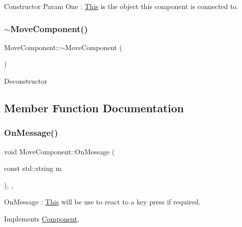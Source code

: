 Constructor Param One \+: \mbox{\hyperlink{class_this}{This}} is the object this component is connected to. \mbox{\label{class_move_component_a5e8430c851f1d83f2b8222c3c4ec097d}} 
\subsubsection{\texorpdfstring{$\sim$\+Move\+Component()}{~MoveComponent()}}
{\footnotesize\ttfamily Move\+Component\+::$\sim$\+Move\+Component (\begin{DoxyParamCaption}{ }\end{DoxyParamCaption})\hspace{0.3cm}{\ttfamily [inline]}}

Deconstructor 

\subsection{Member Function Documentation}
\mbox{\label{class_move_component_a27146b88beda6223ed9f4a82c47a917a}} 
\subsubsection{\texorpdfstring{On\+Message()}{OnMessage()}}
{\footnotesize\ttfamily void Move\+Component\+::\+On\+Message (\begin{DoxyParamCaption}\item[{const std\+::string}]{m }\end{DoxyParamCaption})\hspace{0.3cm}{\ttfamily [inline]}, {\ttfamily [override]}, {\ttfamily [virtual]}}

On\+Message \+: \mbox{\hyperlink{class_this}{This}} will be use to react to a key press if required. 

Implements \mbox{\hyperlink{class_component_a1a880fe5e212cd7ef8241e220660417d}{Component}}.

\mbox{\label{class_move_component_aac8549ecd0670b2b8830d43019d58ea4}} 
